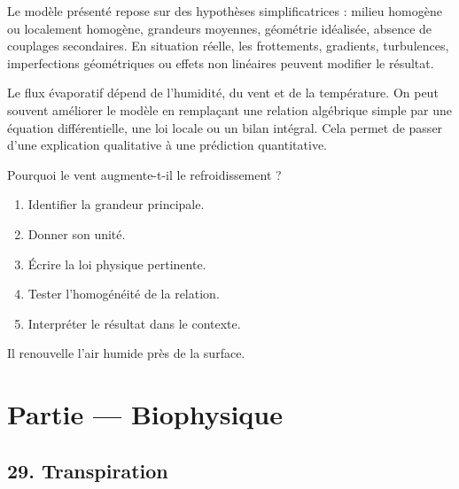 \documentclass[11pt,a4paper]{article}
\begin{document}
\begin{attentionbox}
Le modèle présenté repose sur des hypothèses simplificatrices : milieu homogène ou localement homogène, grandeurs moyennes, géométrie idéalisée, absence de couplages secondaires. En situation réelle, les frottements, gradients, turbulences, imperfections géométriques ou effets non linéaires peuvent modifier le résultat.
\end{attentionbox}

\begin{approfondissementbox}
Le flux évaporatif dépend de l'humidité, du vent et de la température.
On peut souvent améliorer le modèle en remplaçant une relation algébrique simple par une équation différentielle, une loi locale ou un bilan intégral. Cela permet de passer d'une explication qualitative à une prédiction quantitative.
\end{approfondissementbox}

\begin{exercicebox}
Pourquoi le vent augmente-t-il le refroidissement ?
\begin{enumerate}
  \item Identifier la grandeur principale.
  \item Donner son unité.
  \item Écrire la loi physique pertinente.
  \item Tester l'homogénéité de la relation.
  \item Interpréter le résultat dans le contexte.
\end{enumerate}
\end{exercicebox}

\begin{corrigebox}[Indication]
Il renouvelle l'air humide près de la surface.
\end{corrigebox}


\section{Partie — Biophysique}


\subsection{29. Transpiration}
\end{document}
